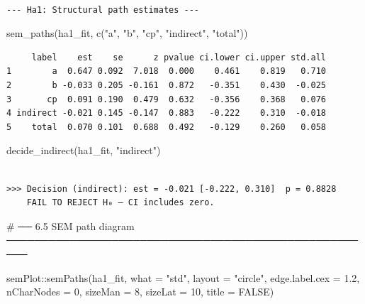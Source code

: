 \documentclass[
  letterpaper,
  DIV=11,
  numbers=noendperiod]{scrartcl}
\newenvironment{Shaded}{\begin{snugshade}}{\end{snugshade}}
\newcommand{\AttributeTok}[1]{\textcolor[rgb]{0.40,0.45,0.13}{#1}}
\newcommand{\CommentTok}[1]{\textcolor[rgb]{0.37,0.37,0.37}{#1}}
\newcommand{\ConstantTok}[1]{\textcolor[rgb]{0.56,0.35,0.01}{#1}}
\newcommand{\DecValTok}[1]{\textcolor[rgb]{0.68,0.00,0.00}{#1}}
\newcommand{\FloatTok}[1]{\textcolor[rgb]{0.68,0.00,0.00}{#1}}
\newcommand{\FunctionTok}[1]{\textcolor[rgb]{0.28,0.35,0.67}{#1}}
\newcommand{\NormalTok}[1]{\textcolor[rgb]{0.00,0.23,0.31}{#1}}
\newcommand{\SpecialCharTok}[1]{\textcolor[rgb]{0.37,0.37,0.37}{#1}}
\newcommand{\StringTok}[1]{\textcolor[rgb]{0.13,0.47,0.30}{#1}}
\begin{document}
\begin{verbatim}

--- Ha1: Structural path estimates ---
\end{verbatim}

\begin{Shaded}
\begin{Highlighting}[]
\FunctionTok{sem\_paths}\NormalTok{(ha1\_fit, }\FunctionTok{c}\NormalTok{(}\StringTok{"a"}\NormalTok{, }\StringTok{"b"}\NormalTok{, }\StringTok{"cp"}\NormalTok{, }\StringTok{"indirect"}\NormalTok{, }\StringTok{"total"}\NormalTok{))}
\end{Highlighting}
\end{Shaded}

\begin{verbatim}
     label    est    se      z pvalue ci.lower ci.upper std.all
1        a  0.647 0.092  7.018  0.000    0.461    0.819   0.710
2        b -0.033 0.205 -0.161  0.872   -0.351    0.430  -0.025
3       cp  0.091 0.190  0.479  0.632   -0.356    0.368   0.076
4 indirect -0.021 0.145 -0.147  0.883   -0.222    0.310  -0.018
5    total  0.070 0.101  0.688  0.492   -0.129    0.260   0.058
\end{verbatim}

\begin{Shaded}
\begin{Highlighting}[]
\FunctionTok{decide\_indirect}\NormalTok{(ha1\_fit, }\StringTok{"indirect"}\NormalTok{)}
\end{Highlighting}
\end{Shaded}

\begin{verbatim}

>>> Decision (indirect): est = -0.021 [-0.222, 0.310]  p = 0.8828
    FAIL TO REJECT H₀ — CI includes zero.
\end{verbatim}

\begin{Shaded}
\begin{Highlighting}[]
\CommentTok{\# ── 6.5  SEM path diagram ─────────────────────────────────────────────────────}

\NormalTok{semPlot}\SpecialCharTok{::}\FunctionTok{semPaths}\NormalTok{(ha1\_fit, }\AttributeTok{what =} \StringTok{"std"}\NormalTok{, }\AttributeTok{layout =} \StringTok{"circle"}\NormalTok{,}
                  \AttributeTok{edge.label.cex =} \FloatTok{1.2}\NormalTok{, }\AttributeTok{nCharNodes =} \DecValTok{0}\NormalTok{,}
                  \AttributeTok{sizeMan =} \DecValTok{8}\NormalTok{, }\AttributeTok{sizeLat =} \DecValTok{10}\NormalTok{, }\AttributeTok{title =} \ConstantTok{FALSE}\NormalTok{)}
\end{Highlighting}
\end{Shaded}
\end{document}
